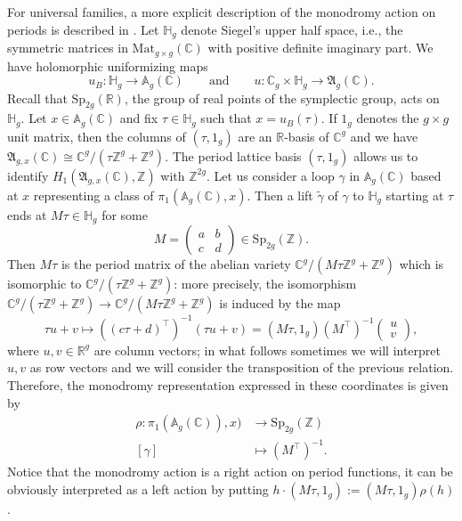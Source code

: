 \documentclass[10 pt,a4paper]{article}
\theoremstyle{plain}
\theoremstyle{definition}
\theoremstyle{named}
\newcommand{\bA}{\mathbb A}
\newcommand{\fA}{\mathfrak A}
\newcommand{\bC}{\mathbb C}
\newcommand{\bH}{\mathbb H}
\newcommand{\bR}{\mathbb R}
\newcommand{\bZ}{\mathbb Z}
\begin{document}
For universal families, a more explicit description of the monodromy action on periods is described in \cite[Section 3]{GHDeg}. Let $\bH_g$ denote Siegel's upper half space, i.e., the symmetric matrices in $\textrm{Mat}_{g\times g}(\bC)$ with positive definite imaginary part. We have holomorphic uniformizing maps
\[
u_B: \bH_g \to \bA_g(\bC) \qquad \textrm{and} \qquad u: \bC_g \times \bH_g \to  \fA_g(\bC).
\]
Recall that $\textrm{Sp}_{2g}(\bR)$, the group of real points of the symplectic group, acts on $\bH_g$. Let $x \in \bA_g(\bC)$ and fix $\tau \in \bH_g$ such that $x = u_B(\tau)$. If $1_g$ denotes the $g\times g$ unit matrix, then the columns of $(\tau, 1_g)$ are an $\bR$-basis of $\bC^g$ and we have $\fA_{g,x}(\bC) \cong \bC^g/(\tau \bZ^g + \bZ^g)$. The period lattice basis $(\tau, 1_g)$ allows us to identify $H_1(\fA_{g,x}(\bC),\bZ)$ with $\bZ^{2g}$. Let us consider a loop $\gamma$ in $\bA_g(\bC)$ based at $x$ representing a class of $\pi_1(\bA_g(\bC),x)$. Then a lift $\widetilde{\gamma}$ of $\gamma$ to $\bH_g$ starting at $\tau$ ends at $M\tau \in \bH_g$ for some
\[
M = \begin{pmatrix}
    a & b\\
    c & d
\end{pmatrix}
\in \textrm{Sp}_{2g}(\bZ).
\]
Then $M\tau$ is the period matrix of the abelian variety $\bC^g/(M\tau\bZ^g + \bZ^g)$ which is isomorphic to $\bC^g/(\tau\bZ^g + \bZ^g)$: more precisely, the isomorphism $\bC^g/(\tau\bZ^g+\bZ^g) \to \bC^g/(M\tau\bZ^g+ \bZ^g)$ is induced by the map
\[
\tau u + v \mapsto ((c\tau+d)^\top)^{-1}(\tau u + v) = (M\tau,1_g)(M^\top)^{-1}\begin{pmatrix}
    u\\
    v
\end{pmatrix},
\]
where $u, v \in \bR^g$ are column vectors; in what follows sometimes we will interpret $u,v$ as row vectors and we will consider the transposition of the previous relation. Therefore, the monodromy representation expressed in these coordinates is given by
\begin{equation}\label{columnAction}
    \begin{aligned}
        \rho: \pi_1(\bA_g(\bC)),x) &\to \textrm{Sp}_{2g}(\bZ)\\
        [\gamma] &\mapsto (M^\top)^{-1}.
    \end{aligned}
\end{equation}
Notice that the monodromy action is a right action on period functions, it can be obviously interpreted as a left action by putting $h\cdot (M\tau,1_g):=(M\tau,1_g)\rho(h)$.
\end{document}
